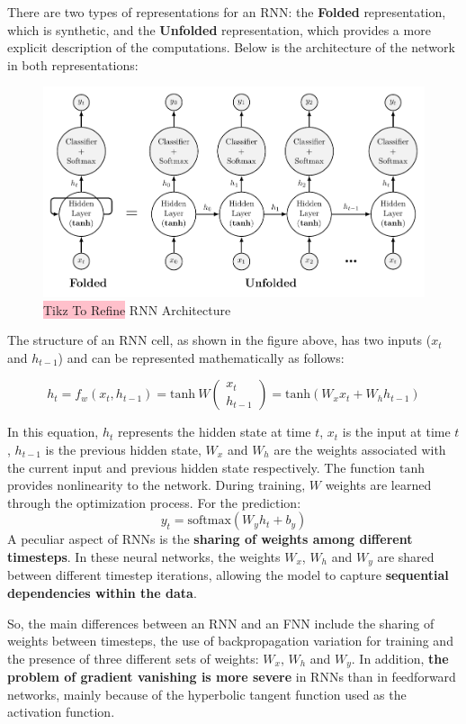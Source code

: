 There are two types of representations for an RNN: the \textbf{Folded} representation, which is synthetic, and the \textbf{Unfolded} representation, which provides a more explicit description of the computations. Below is the architecture of the network in both representations:

\begin{figure}[!htbp]
    \centering
    \includegraphics[width = 0.9\linewidth]{tikz/chapter6 - RNN Architecture.pdf}
    \caption{{\color{red}\colorbox{pink}{Tikz To Refine}} RNN Architecture}
\end{figure}

The structure of an RNN cell, as shown in the figure above, has two inputs ($x_t$ and $h_{t-1}$) and can be represented mathematically as follows:

$$
h_t = f_w(x_t,h_{t-1}) = \text{tanh} \ W \begin{pmatrix}
x_t \\
h_{t-1}
\end{pmatrix} = \text{tanh}(W_xx_t + W_hh_{t-1})
$$

In this equation, $h_t$ represents the hidden state at time $t$, $x_t$ is the input at time $t$, $h_{t-1}$ is the previous hidden state, $W_x$ and $W_h$ are the weights associated with the current input and previous hidden state respectively. The function $\text{tanh}$ provides nonlinearity to the network. During training, $W$ weights are learned through the optimization process. For the prediction:
$$
y_t = \text{softmax}(W_y h_t + b_y)
$$
A peculiar aspect of RNNs is the \textbf{sharing of weights among different timesteps}. In these neural networks, the weights $W_x$, $W_h$ and $W_y$ are shared between different timestep iterations, allowing the model to capture \textbf{sequential dependencies within the data}.

So, the main differences between an RNN and an FNN include the sharing of weights between timesteps, the use of backpropagation variation for training and the presence of three different sets of weights: $W_x$, $W_h$ and $W_y$. In addition, \textbf{the problem of gradient vanishing is more severe} in RNNs than in feedforward networks, mainly because of the hyperbolic tangent function used as the activation function.


